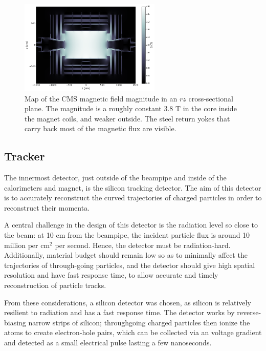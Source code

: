 \begin{figure}[t]
  \begin{center}
    \includegraphics[width=0.60\textwidth]{figs/cms/cms_bfield_coarse.png}
    \caption{Map of the CMS magnetic field magnitude in an $rz$ cross-sectional plane.
      The magnitude is a roughly constant 3.8 T in the core inside the magnet coils, and weaker outside.
      The steel return yokes that carry back most of the magnetic flux are visible.
            }
    \label{fig:cms_bfield}
  \end{center}
\end{figure}

\subsection{Tracker}

The innermost detector, just outside of the beampipe and inside of the calorimeters and magnet,
is the silicon tracking detector. The aim of this detector is to accurately reconstruct the curved
trajectories of charged particles in order to reconstruct their momenta. 

A central challenge in the design of this detector is the radiation level so close to the beam: 
at 10 cm from the beampipe, the incident particle flux is around 10 million per cm$^2$ per second.
Hence, the detector must be radiation-hard. Additionally, material budget should remain
low so as to minimally affect the trajectories of through-going particles, and the detector
should give high spatial resolution and have fast response time, to allow accurate and timely
reconstruction of particle tracks.

From these considerations, a silicon detector was chosen, as silicon is relatively resilient
to radiation and has a fast response time. The detector works by reverse-biasing narrow
strips of silicon; throughgoing charged particles then ionize the atoms to create
electron-hole pairs, which can be collected via an voltage gradient and detected
as a small electrical pulse lasting a few nanoseconds.

